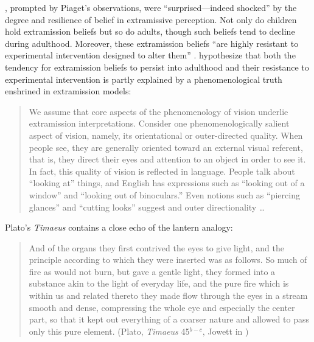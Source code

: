 \citet[138]{Winer:1996as}, prompted by Piaget's observations, were ``sur\-pri\-sed---indeed shocked'' by the degree and resilience of belief in extramissive perception. Not only do children hold extramission beliefs but so do adults, though such beliefs tend to decline during adulthood. Moreover, these extramission beliefs ``are highly resistant to experimental intervention designed to alter them'' \citep[138]{Winer:1996as}. \citet{Winer:1996as} hypothesize that both the tendency for extramission beliefs to persist into adulthood and their resistance to experimental intervention is partly explained by a phenomenological truth enshrined in extramission models:
\begin{quote}
	We assume that core aspects of the phenomenology of vision underlie extramission interpretations. Consider one phenomenologically salient aspect of vision, namely, its orientational or outer-directed quality. When people see, they are generally oriented toward an external visual referent, that is, they direct their eyes and attention to an object in order to see it. In fact, this quality of vision is reflected in language. People talk about ``looking at'' things, and English has expressions such as ``looking out of a window'' and ``looking out of binoculars.'' Even notions such as ``piercing glances'' and ``cutting looks'' suggest and outer directionality \ldots\ \citep[140]{Winer:1996as}
\end{quote}

Plato's \emph{Timaeus} contains a close echo of the lantern analogy: 
\begin{quote}
	And of the organs they first contrived the eyes to give light, and the principle according to which they were inserted was as follows. So much of fire as would not burn, but gave a gentle light, they formed into a substance akin to the light of everyday life, and the pure fire which is within us and related thereto they made flow through the eyes in a stream smooth and dense, compressing the whole eye and especially the center part, so that it kept out everything of a coarser nature and allowed to pass only this pure element. (Plato, \emph{Timaeus} 45\( ^{b-c} \), Jowett in \citealt{Hamilton:1989fk})
\end{quote}

